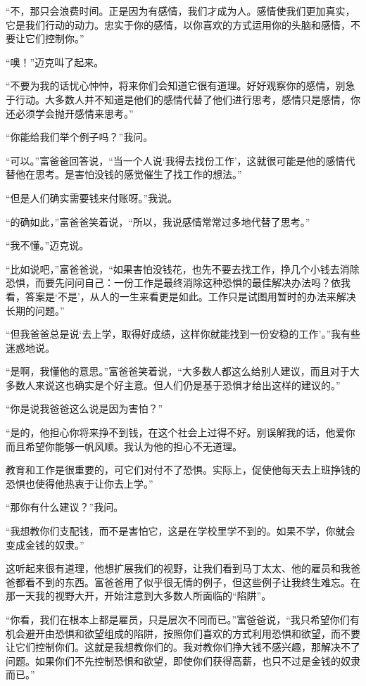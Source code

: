 “不，那只会浪费时间。正是因为有感情，我们才成为人。感情使我们更加真实，它是我们行动的动力。忠实于你的感情，以你喜欢的方式运用你的头脑和感情，不要让它们控制你。”

“噢！”迈克叫了起来。

“不要为我的话忧心忡忡，将来你们会知道它很有道理。好好观察你的感情，别急于行动。大多数人并不知道是他们的感情代替了他们进行思考，感情只是感情，你还必须学会抛开感情来思考。”

“你能给我们举个例子吗？”我问。

“可以。”富爸爸回答说，“当一个人说‘我得去找份工作’，这就很可能是他的感情代替他在思考。是害怕没钱的感觉催生了找工作的想法。”

“但是人们确实需要钱来付账呀。”我说。

“的确如此，”富爸爸笑着说，“所以，我说感情常常过多地代替了思考。”

“我不懂。”迈克说。

“比如说吧，”富爸爸说，“如果害怕没钱花，也先不要去找工作，挣几个小钱去消除恐惧，而要先问问自己：一份工作是最终消除这种恐惧的最佳解决办法吗？依我看，答案是‘不是’，从人的一生来看更是如此。工作只是试图用暂时的办法来解决长期的问题。”

“但我爸爸总是说‘去上学，取得好成绩，这样你就能找到一份安稳的工作’。”我有些迷惑地说。

“是啊，我懂他的意思。”富爸爸笑着说，“大多数人都这么给别人建议，而且对于大多数人来说这也确实是个好主意。但人们仍是基于恐惧才给出这样的建议的。”

“你是说我爸爸这么说是因为害怕？”

“是的，他担心你将来挣不到钱，在这个社会上过得不好。别误解我的话，他爱你而且希望你能够一帆风顺。我认为他的担心不无道理。

教育和工作是很重要的，可它们对付不了恐惧。实际上，促使他每天去上班挣钱的恐惧也使得他热衷于让你去上学。”

“那你有什么建议？”我问。

“我想教你们支配钱，而不是害怕它，这是在学校里学不到的。如果不学，你就会变成金钱的奴隶。”

这听起来很有道理，他想扩展我们的视野，让我们看到马丁太太、他的雇员和我爸爸都看不到的东西。富爸爸用了似乎很无情的例子，但这些例子让我终生难忘。在那一天我的视野大开，开始注意到大多数人所面临的“陷阱”。

“你看，我们在根本上都是雇员，只是层次不同而已。”富爸爸说，“我只希望你们有机会避开由恐惧和欲望组成的陷阱，按照你们喜欢的方式利用恐惧和欲望，而不要让它们控制你们。这就是我想教你们的。我对教你们挣大钱不感兴趣，那解决不了问题。如果你们不先控制恐惧和欲望，即使你们获得高薪，也只不过是金钱的奴隶而已。”

